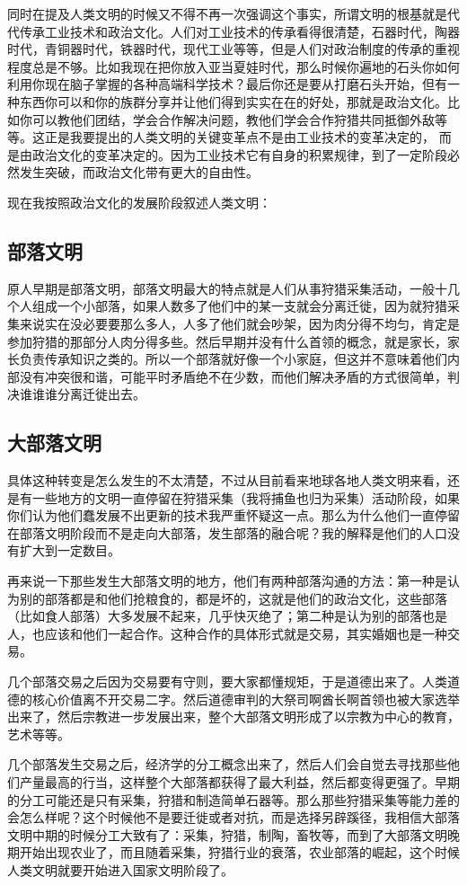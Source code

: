 \documentclass[12pt]{exam}%
\begin{document}
同时在提及人类文明的时候又不得不再一次强调这个事实，所谓文明的根基就是代代传承工业技术和政治文化。人们对工业技术的传承看得很清楚，石器时代，陶器时代，青铜器时代，铁器时代，现代工业等等，但是人们对政治制度的传承的重视程度总是不够。比如我现在把你放入亚当夏娃时代，那么时候你遍地的石头你如何利用你现在脑子掌握的各种高端科学技术？最后你还是要从打磨石头开始，但有一种东西你可以和你的族群分享并让他们得到实实在在的好处，那就是政治文化。比如你可以教他们团结，学会合作解决问题，教他们学会合作狩猎共同抵御外敌等等。这正是我要提出的人类文明的关键变革点不是由工业技术的变革决定的， 而是由政治文化的变革决定的。因为工业技术它有自身的积累规律，到了一定阶段必然发生突破，而政治文化带有更大的自由性。

现在我按照政治文化的发展阶段叙述人类文明：
\subsection{部落文明}
原人早期是部落文明，部落文明最大的特点就是人们从事狩猎采集活动，一般十几个人组成一个小部落，如果人数多了他们中的某一支就会分离迁徙，因为就狩猎采集来说实在没必要要那么多人，人多了他们就会吵架，因为肉分得不均匀，肯定是参加狩猎的那部分人肉分得多些。然后早期并没有什么首领的概念，就是家长，家长负责传承知识之类的。所以一个部落就好像一个小家庭，但这并不意味着他们内部没有冲突很和谐，可能平时矛盾绝不在少数，而他们解决矛盾的方式很简单，判决谁谁谁分离迁徙出去。

\subsection{大部落文明}
具体这种转变是怎么发生的不太清楚，不过从目前看来地球各地人类文明来看，还是有一些地方的文明一直停留在狩猎采集（我将捕鱼也归为采集）活动阶段，如果你们认为他们蠢发展不出更新的技术我严重怀疑这一点。那么为什么他们一直停留在部落文明阶段而不是走向大部落，发生部落的融合呢？我的解释是他们的人口没有扩大到一定数目。

再来说一下那些发生大部落文明的地方，他们有两种部落沟通的方法：第一种是认为别的部落都是和他们抢粮食的，都是坏的，这就是他们的政治文化，这些部落（比如食人部落）大多发展不起来，几乎快灭绝了；第二种是认为别的部落也是人，也应该和他们一起合作。这种合作的具体形式就是交易，其实婚姻也是一种交易。

几个部落交易之后因为交易要有守则，要大家都懂规矩，于是道德出来了。人类道德的核心价值离不开交易二字。然后道德审判的大祭司啊酋长啊首领也被大家选举出来了，然后宗教进一步发展出来，整个大部落文明形成了以宗教为中心的教育，艺术等等。

几个部落发生交易之后，经济学的分工概念出来了，然后人们会自觉去寻找那些他们产量最高的行当，这样整个大部落都获得了最大利益，然后都变得更强了。早期的分工可能还是只有采集，狩猎和制造简单石器等。那么那些狩猎采集等能力差的会怎么样呢？这个时候他不是要迁徙或者对抗，而是选择另辟蹊径，我相信大部落文明中期的时候分工大致有了：采集，狩猎，制陶，畜牧等，而到了大部落文明晚期开始出现农业了，而且随着采集，狩猎行业的衰落，农业部落的崛起，这个时候人类文明就要开始进入国家文明阶段了。
\end{document}
